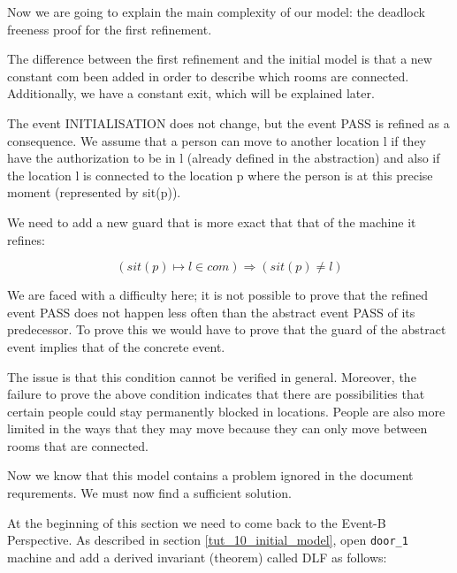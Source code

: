 Now we are going to explain the main complexity of our model: the deadlock freeness proof for the first refinement. 

The difference between the first refinement and the initial model is that a new constant \textsf{com} been added in order to describe which rooms are connected. Additionally, we have a constant \textsf{exit}, which will be explained later. 

The event \textsf{INITIALISATION} does not change, but the event \textsf{PASS} is refined as a consequence. We assume that a person can move to another location l if they have the authorization to be in l (already defined in the abstraction) and also if the location l is connected to the location p where the person is at this precise moment (represented by sit(p)).

We need to add a new guard that is more exact that that of the machine it refines:

\[
( sit(p) \mapsto l \in com ) \Rightarrow ( sit(p)\neq l )
\]

We are faced with a difficulty here; it is not possible to prove that the refined event \textsf{PASS} does not happen less often than the abstract event \textsf{PASS} of its predecessor. To prove this we would have to prove that the guard of the abstract event implies that of the concrete event.

The issue is that this condition cannot be verified in general. Moreover, the failure to prove the above condition indicates that there are possibilities that certain people could stay permanently blocked in locations. People are also more limited in the ways that they may move because they can only move between rooms that are connected.

Now we know that this model contains a problem ignored in the document requrements. We must now find a sufficient solution.


At the beginning of this section we need to come back to the \textsf{Event-B Perspective}. As described in section \ref{tut_10_initial_model}, open \texttt{door\_1} machine and add a derived invariant (theorem) called \textsf{DLF} as follows: 

\begin{description}
\INVARIANTS
	\begin{description}
	\end{description}
\end{description}

